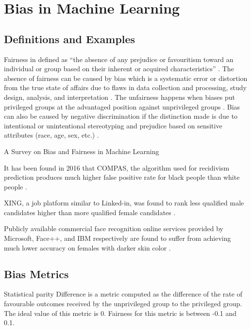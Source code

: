 \documentclass[final,5p,times,twocolumn]{elsarticle}
\begin{document}
\section{Bias in Machine Learning}
\label{sec:bias_in_machine_learning}

\subsection{Definitions and Examples}
\label{sec:definitions_and_examples}

Fairness in defined as ``the absence of any prejudice or favouritism toward an individual or
group based on their inherent or acquired characteristics'' \cite{mehrabi2021survey}.
The absence of fairness can be caused by bias which is a systematic error or distortion from the true state of affairs due to flaws in data collection and processing, study design, analysis, and interpretation \cite{oxford2022bias}. 
The unfairness happens when biases put privileged groups at the advantaged position against unprivileged groups \cite{bellamy2018ai}. 
Bias can also be caused by negative discrimination if the distinction made is due to intentional or unintentional stereotyping and prejudice based on sensitive attributes (race, age, sex, etc.) \cite{mehrabi2021survey,chen2019fairness}. 






A Survey on Bias and Fairness in Machine Learning

It has been found in 2016 that COMPAS, the algorithm used for recidivism prediction produces much higher false positive rate for black people than white people \cite{angwin2016machine}.

XING, a job platform similar to Linked-in, was found to rank less qualified male candidates higher than more qualified female candidates \cite{lahoti2019ifair}.

Publicly available commercial face recognition online services provided by Microsoft, Face++, and IBM respectively are found to suffer from achieving much lower accuracy on females with darker skin color \cite{buolamwini2018gender}.

\subsection{Bias Metrics}
\label{sec:bias_metrics}



Statistical parity Difference \cite{dwork2012fairness,bellamy2018ai} is a metric computed as the difference of the rate of favourable outcomes received by the unprivileged group to the privileged group. The ideal value of this metric is 0. Fairness for this metric is between -0.1 and 0.1.
\end{document}
